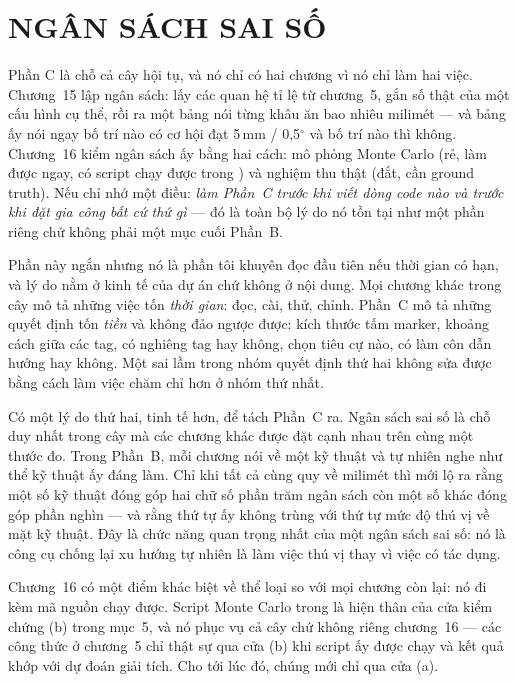 \documentclass[../marker.tex]{subfiles}
\begin{document}
\part{NGÂN SÁCH SAI SỐ}
\begin{tomtat}
Phần C là chỗ cả cây hội tụ, và nó chỉ có hai chương vì nó chỉ làm hai việc. Chương~15 lập ngân sách: lấy các quan hệ tỉ lệ từ chương~5, gắn số thật của một cấu hình cụ thể, rồi ra một bảng nói từng khâu ăn bao nhiêu milimét --- và bảng ấy nói ngay bố trí nào có cơ hội đạt 5\,mm / 0,5\(^\circ\) và bố trí nào thì không. Chương~16 kiểm ngân sách ấy bằng hai cách: mô phỏng Monte Carlo (rẻ, làm được ngay, có script chạy được trong ) và nghiệm thu thật (đắt, cần ground truth). Nếu chỉ nhớ một điều: \emph{làm Phần~C trước khi viết dòng code nào và trước khi đặt gia công bất cứ thứ gì} --- đó là toàn bộ lý do nó tồn tại như một phần riêng chứ không phải một mục cuối Phần~B.
\end{tomtat}

Phần này ngắn nhưng nó là phần tôi khuyên đọc đầu tiên nếu thời gian có hạn, và lý do nằm ở kinh tế của dự án chứ không ở nội dung. Mọi chương khác trong cây mô tả những việc tốn \emph{thời gian}: đọc, cài, thử, chỉnh. Phần~C mô tả những quyết định tốn \emph{tiền} và không đảo ngược được: kích thước tấm marker, khoảng cách giữa các tag, có nghiêng tag hay không, chọn tiêu cự nào, có làm côn dẫn hướng hay không. Một sai lầm trong nhóm quyết định thứ hai không sửa được bằng cách làm việc chăm chỉ hơn ở nhóm thứ nhất.

Có một lý do thứ hai, tinh tế hơn, để tách Phần~C ra. Ngân sách sai số là chỗ duy nhất trong cây mà các chương khác được đặt cạnh nhau trên cùng một thước đo. Trong Phần~B, mỗi chương nói về một kỹ thuật và tự nhiên nghe như thể kỹ thuật ấy đáng làm. Chỉ khi tất cả cùng quy về milimét thì mới lộ ra rằng một số kỹ thuật đóng góp hai chữ số phần trăm ngân sách còn một số khác đóng góp phần nghìn --- và rằng thứ tự ấy không trùng với thứ tự mức độ thú vị về mặt kỹ thuật. Đây là chức năng quan trọng nhất của một ngân sách sai số: nó là công cụ chống lại xu hướng tự nhiên là làm việc thú vị thay vì việc có tác dụng.

Chương~16 có một điểm khác biệt về thể loại so với mọi chương còn lại: nó đi kèm mã nguồn chạy được. Script Monte Carlo trong  là hiện thân của cửa kiểm chứng (b) trong  mục~5, và nó phục vụ cả cây chứ không riêng chương~16 --- các công thức ở chương~5 chỉ thật sự qua cửa (b) khi script ấy được chạy và kết quả khớp với dự đoán giải tích. Cho tới lúc đó, chúng mới chỉ qua cửa (a).



\ifSubfilesClassLoaded{\printbibliography[title={Nguồn}]}{}
\end{document}
